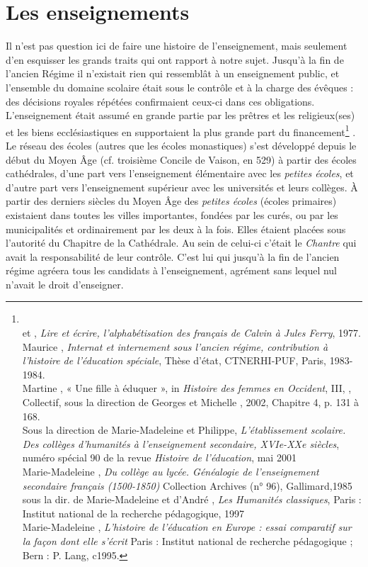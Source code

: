  

\section{Les enseignements}

    
   Il n'est pas question ici de faire une histoire de l'enseignement, mais seulement d'en esquisser les grands traits qui ont rapport à notre sujet. Jusqu'à la fin de l'ancien Régime il n'existait rien qui ressemblât à un enseignement public, et l'ensemble du domaine scolaire était sous le contrôle et à la charge des évêques : des décisions royales répétées confirmaient ceux-ci dans ces obligations. L'enseignement était assumé en grande partie par les prêtres et les religieux(ses) et les biens ecclésiastiques en supportaient la plus grande part du financement\footnote{\\ et , \emph{Lire et écrire, l'alphabétisation des français de Calvin à Jules Ferry}, 1977.
\\Maurice {}, \emph{Internat et internement sous l'ancien régime, contribution à l'histoire de l'éducation spéciale}, Thèse d'état, CTNERHI-PUF, Paris, 1983-1984.
\\Martine {}, {« Une fille à éduquer », in \emph{Histoire des femmes en Occident}, III, }, Collectif, sous la direction de Georges  et Michelle , 2002, Chapitre 4, p. 131 à 168.
\\Sous la direction de Marie-Madeleine  et Philippe, \emph{L’établissement scolaire. Des collèges d'humanités à l'enseignement secondaire, XVIe-XXe siècles}, numéro spécial 90 de la revue \emph{Histoire de l’éducation}, mai 2001
\\ Marie-Madeleine , \emph{Du collège au lycée. Généalogie de l'enseignement secondaire français (1500-1850)}
Collection Archives (n° 96), Gallimard,1985 
\\sous la dir. de Marie-Madeleine  et d'André , \emph{Les Humanités classiques}, Paris : Institut national de la recherche pédagogique, 1997
\\Marie-Madeleine ,	\emph{L'histoire de l'éducation en Europe : essai comparatif sur la façon dont elle s'écrit} Paris : Institut national de recherche pédagogique ; Bern : P. Lang, c1995. }%
. Le réseau des écoles (autres que les écoles monastiques) s'est développé depuis le début du Moyen Âge (cf. troisième Concile de Vaison, en 529) à partir des écoles cathédrales, d'une part vers l'enseignement élémentaire avec les \emph{petites écoles}, et d'autre part vers l'enseignement supérieur avec les universités et leurs collèges. À partir des derniers siècles du Moyen Âge des \emph{petites écoles} (écoles primaires) existaient dans toutes les villes importantes, fondées par les curés, ou par les municipalités et ordinairement par les deux à la fois. Elles étaient placées sous l'autorité du Chapitre de la Cathédrale. Au sein de celui-ci c'était le \emph{Chantre} qui avait la responsabilité de leur contrôle. C'est lui qui jusqu'à la fin de l'ancien régime agréera tous les candidats à l'enseignement, agrément sans lequel nul n'avait le droit d'enseigner.

